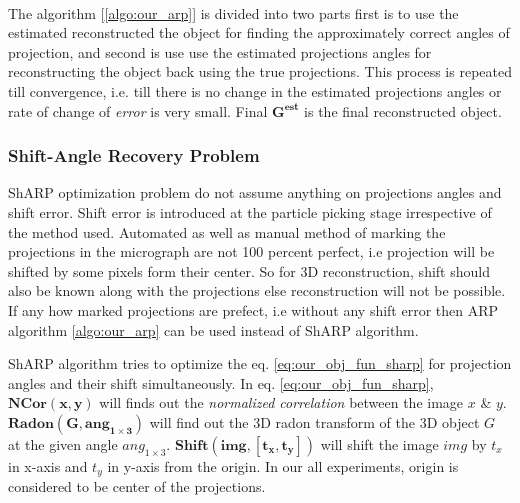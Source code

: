 \documentclass{report}
\begin{document}
\hspace{1cm}\\
The algorithm [\ref{algo:our_arp}] is divided into two parts first is to use the estimated reconstructed the object for finding the approximately correct angles of projection, and second is use use the estimated projections angles for reconstructing the object back using the true projections. This process is repeated till convergence, i.e. till there is no change in the estimated projections angles or rate of change of \textit{error} is very small. Final ${\boldsymbol{G^{est}}}$ is the final reconstructed object. 


\subsubsection{Shift-Angle Recovery Problem}

ShARP  optimization problem do not assume anything on projections angles and shift error. Shift error is introduced at the particle picking stage irrespective of the method used. Automated as well as manual method of marking the projections in the micrograph are not 100 percent perfect, i.e projection will be shifted by some pixels form their center. So for 3D reconstruction, shift should also be known along with the projections else reconstruction will not be possible. If any how marked projections are prefect, i.e without any shift error then ARP algorithm \ref{algo:our_arp} can be used instead of ShARP algorithm.  

ShARP algorithm tries to optimize the eq. \ref{eq:our_obj_fun_sharp} for projection angles and their shift simultaneously.  In eq. \ref{eq:our_obj_fun_sharp}, ${\boldsymbol{NCor(x,y)}}$ will finds out the \textit{normalized correlation} between the image ${x}$ \& ${y}$. ${\boldsymbol{Radon(G,ang_{1\times 3})}}$ will find out the 3D radon transform of the 3D object ${G}$ at the given angle ${ang_{1 \times 3}}$. ${\boldsymbol{Shift(img,[t_x,t_y])}}$ will shift the image ${img}$ by ${t_x}$ in x-axis and ${t_y}$ in y-axis from the origin. In our all experiments, origin is considered to be center of the projections.   
\end{document}
